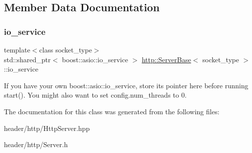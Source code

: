 \subsection{Member Data Documentation}
\mbox{\label{classhttp_1_1_server_base_a89757fd47a78aa8686df56b4ca78bdd1}} 
\subsubsection{\texorpdfstring{io\+\_\+service}{io\_service}}
{\footnotesize\ttfamily template$<$class socket\+\_\+type$>$ \\
std\+::shared\+\_\+ptr$<$ boost\+::asio\+::io\+\_\+service $>$ \hyperlink{classhttp_1_1_server_base}{http\+::\+Server\+Base}$<$ socket\+\_\+type $>$\+::io\+\_\+service}

If you have your own boost\+::asio\+::io\+\_\+service, store its pointer here before running start(). You might also want to set config.\+num\+\_\+threads to 0. 

The documentation for this class was generated from the following files\+:\begin{DoxyCompactItemize}
\item 
header/http/Http\+Server.\+hpp\item 
header/http/Server.\+h\end{DoxyCompactItemize}
